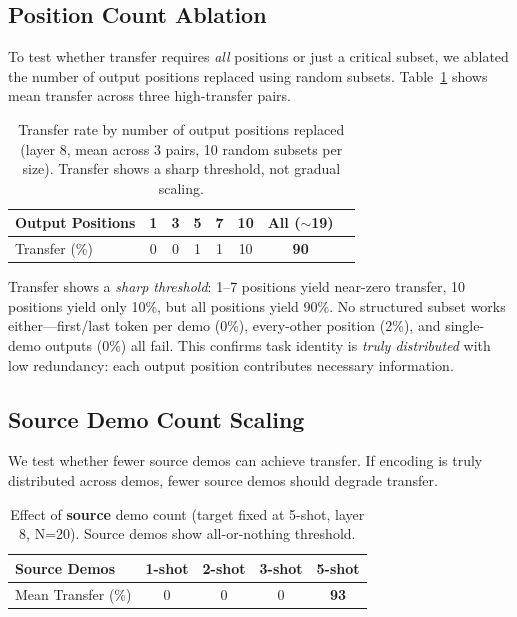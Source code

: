 \documentclass[sigconf,anonymous]{acmart}
\begin{document}
\subsection{Position Count Ablation}

To test whether transfer requires \emph{all} positions or just a critical subset, we ablated the number of output positions replaced using random subsets. Table~\ref{tab:position_count} shows mean transfer across three high-transfer pairs.

\begin{table}[h]
\centering
\small
\caption{Transfer rate by number of output positions replaced (layer 8, mean across 3 pairs, 10 random subsets per size). Transfer shows a sharp threshold, not gradual scaling.}
\label{tab:position_count}
\begin{tabular}{@{}lccccccc@{}}
\toprule
Output Positions & 1 & 3 & 5 & 7 & 10 & All ($\sim$19) \\
\midrule
Transfer (\%) & 0 & 0 & 1 & 1 & 10 & \textbf{90} \\
\bottomrule
\end{tabular}
\end{table}

Transfer shows a \emph{sharp threshold}: 1--7 positions yield near-zero transfer, 10 positions yield only 10\%, but all positions yield 90\%. No structured subset works either---first/last token per demo (0\%), every-other position (2\%), and single-demo outputs (0\%) all fail. This confirms task identity is \emph{truly distributed} with low redundancy: each output position contributes necessary information.

\subsection{Source Demo Count Scaling}

We test whether fewer source demos can achieve transfer. If encoding is truly distributed across demos, fewer source demos should degrade transfer.

\begin{table}[h]
\centering
\small
\caption{Effect of \textbf{source} demo count (target fixed at 5-shot, layer 8, N=20). Source demos show all-or-nothing threshold.}
\label{tab:source_demos}
\begin{tabular}{@{}lcccc@{}}
\toprule
Source Demos & 1-shot & 2-shot & 3-shot & 5-shot \\
\midrule
Mean Transfer (\%) & 0 & 0 & 0 & \textbf{93} \\
\bottomrule
\end{tabular}
\end{table}
\end{document}
